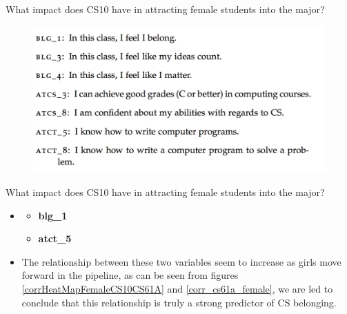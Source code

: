 \documentclass{beamer}                  %
\begin{document}
\begin{frame}{What impact does CS10 have in attracting female students into the major?}

  \begin{figure}[!htbp]
      \centering
      \includegraphics[width=1\textwidth]{BLG-ATCT}
      
  \end{figure}

\end{frame}

\begin{frame}{What impact does CS10 have in attracting female students into the major?}

  \begin{itemize}
  \item 
    \begin{itemize}
      \item \textbf{blg\_1}
      \item \textbf{atct\_5}
    \end{itemize}
  \item The relationship between these two variables seem to increase as girls move forward in the pipeline, as can be seen from figures \ref{corrHeatMapFemaleCS10CS61A} and \ref{corr_cs61a_female},  we are led to conclude that this relationship is truly a strong predictor of CS belonging.
  \end{itemize}

\end{frame}
\end{document}
